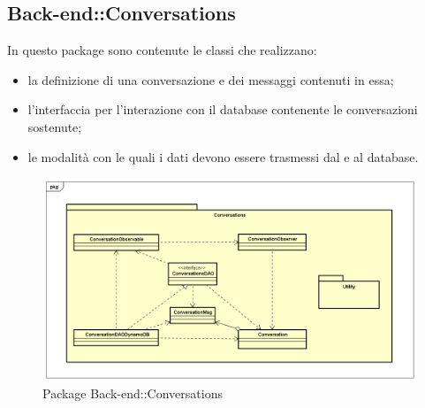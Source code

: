 \subsection{Back-end::Conversations}
In questo package sono contenute le classi che realizzano: \begin{itemize} \item la definizione di una conversazione e dei messaggi contenuti in essa; \item l'interfaccia per l'interazione con il database contenente le conversazioni sostenute; \item le modalità con le quali i dati devono essere trasmessi dal e al database. \end{itemize}
\begin{figure}[h] \centering \includegraphics[width=\textwidth,height=\textheight,keepaspectratio]{images/diagrams/back-end/Official_Backend_0304/Conversations.png}
	\caption{Package Back-end::Conversations}
\end{figure}
\newpage

